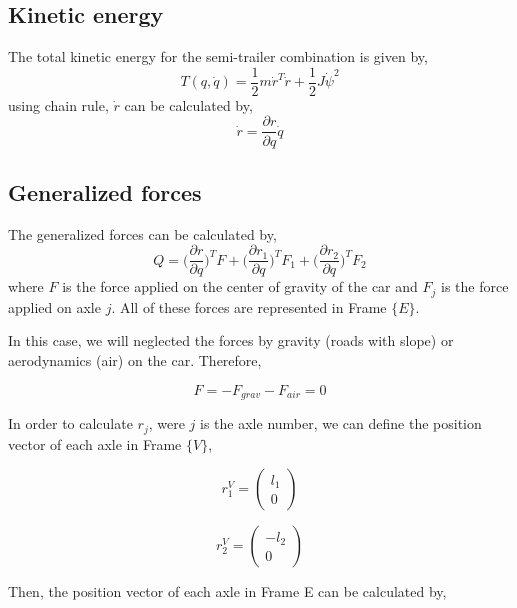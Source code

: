 \documentclass[12pt]{article}
\begin{document}
\subsection{Kinetic energy}
The total kinetic energy for the semi-trailer combination is given by,
\begin{equation}
    T(q,\dot{q}) = \frac{1}{2}m \dot{r}^T \dot{r}  + \frac{1}{2}J\dot{\psi}^2
\end{equation}
using chain rule, $\dot{r}$ can be calculated by,
\begin{equation}
    \dot{r} = \frac{\partial r}{\partial q}\dot{q}
\end{equation}

\subsection{Generalized forces}
The generalized forces can be calculated by,
\begin{equation}
    Q =  \Big( \frac{\partial r}{\partial q} \Big)^T F + \Big( \frac{\partial r_{1}}{\partial q} \Big)^T F_{1} + \Big( \frac{\partial r_{2}}{\partial q} \Big)^T F_{2}
\end{equation}
where $F$ is the force applied on the center of gravity of the car and $F_j$ is the force applied on axle $j$. All of these forces are represented in Frame $\{ E \}$.

In this case, we will neglected the forces by gravity (roads with slope) or aerodynamics (air) on the car. Therefore,

\begin{equation}
    F = - F_{grav} - F_{air} = 0
\end{equation}

In order to calculate $r_j$, were $j$ is the axle number, we can define the position vector of each axle in Frame $\{ V \}$,

\begin{equation}
    r_1^V = \begin{pmatrix} l_1 \\ 0 \end{pmatrix}
\end{equation}

\begin{equation}
    r_2^V = \begin{pmatrix} - l_2 \\ 0 \end{pmatrix}
\end{equation}

Then, the position vector of each axle in Frame {E} can be calculated by,
\end{document}
